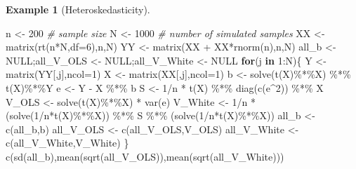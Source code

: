 \documentclass[
  12pt,
]{book}
\newenvironment{Shaded}{\begin{snugshade}}{\end{snugshade}}
\newcommand{\AttributeTok}[1]{\textcolor[rgb]{0.77,0.63,0.00}{#1}}
\newcommand{\CommentTok}[1]{\textcolor[rgb]{0.56,0.35,0.01}{\textit{#1}}}
\newcommand{\ConstantTok}[1]{\textcolor[rgb]{0.00,0.00,0.00}{#1}}
\newcommand{\ControlFlowTok}[1]{\textcolor[rgb]{0.13,0.29,0.53}{\textbf{#1}}}
\newcommand{\DecValTok}[1]{\textcolor[rgb]{0.00,0.00,0.81}{#1}}
\newcommand{\FunctionTok}[1]{\textcolor[rgb]{0.00,0.00,0.00}{#1}}
\newcommand{\NormalTok}[1]{#1}
\newcommand{\OtherTok}[1]{\textcolor[rgb]{0.56,0.35,0.01}{#1}}
\newcommand{\SpecialCharTok}[1]{\textcolor[rgb]{0.00,0.00,0.00}{#1}}
\theoremstyle{definition}
\theoremstyle{definition}
\newtheorem{example}{Example}[chapter]
\theoremstyle{definition}
\theoremstyle{definition}
\theoremstyle{remark}
\begin{document}
\begin{example}[Heteroskedasticity]
\begin{Shaded}
\begin{Highlighting}[]
\NormalTok{n }\OtherTok{\textless{}{-}} \DecValTok{200} \CommentTok{\# sample size}
\NormalTok{N }\OtherTok{\textless{}{-}} \DecValTok{1000} \CommentTok{\# number of simulated samples}
\NormalTok{XX }\OtherTok{\textless{}{-}} \FunctionTok{matrix}\NormalTok{(}\FunctionTok{rt}\NormalTok{(n}\SpecialCharTok{*}\NormalTok{N,}\AttributeTok{df=}\DecValTok{6}\NormalTok{),n,N)}
\NormalTok{YY }\OtherTok{\textless{}{-}} \FunctionTok{matrix}\NormalTok{(XX }\SpecialCharTok{+}\NormalTok{ XX}\SpecialCharTok{*}\FunctionTok{rnorm}\NormalTok{(n),n,N)}
\NormalTok{all\_b       }\OtherTok{\textless{}{-}} \ConstantTok{NULL}\NormalTok{;all\_V\_OLS   }\OtherTok{\textless{}{-}} \ConstantTok{NULL}\NormalTok{;all\_V\_White }\OtherTok{\textless{}{-}} \ConstantTok{NULL}
\ControlFlowTok{for}\NormalTok{(j }\ControlFlowTok{in} \DecValTok{1}\SpecialCharTok{:}\NormalTok{N)\{}
\NormalTok{  Y }\OtherTok{\textless{}{-}} \FunctionTok{matrix}\NormalTok{(YY[,j],}\AttributeTok{ncol=}\DecValTok{1}\NormalTok{)}
\NormalTok{  X }\OtherTok{\textless{}{-}} \FunctionTok{matrix}\NormalTok{(XX[,j],}\AttributeTok{ncol=}\DecValTok{1}\NormalTok{)}
\NormalTok{  b }\OtherTok{\textless{}{-}} \FunctionTok{solve}\NormalTok{(}\FunctionTok{t}\NormalTok{(X)}\SpecialCharTok{\%*\%}\NormalTok{X) }\SpecialCharTok{\%*\%} \FunctionTok{t}\NormalTok{(X)}\SpecialCharTok{\%*\%}\NormalTok{Y}
\NormalTok{  e }\OtherTok{\textless{}{-}}\NormalTok{ Y }\SpecialCharTok{{-}}\NormalTok{ X }\SpecialCharTok{\%*\%}\NormalTok{ b}
\NormalTok{  S }\OtherTok{\textless{}{-}} \DecValTok{1}\SpecialCharTok{/}\NormalTok{n }\SpecialCharTok{*} \FunctionTok{t}\NormalTok{(X) }\SpecialCharTok{\%*\%} \FunctionTok{diag}\NormalTok{(}\FunctionTok{c}\NormalTok{(e}\SpecialCharTok{\^{}}\DecValTok{2}\NormalTok{)) }\SpecialCharTok{\%*\%}\NormalTok{ X}
\NormalTok{  V\_OLS   }\OtherTok{\textless{}{-}} \FunctionTok{solve}\NormalTok{(}\FunctionTok{t}\NormalTok{(X)}\SpecialCharTok{\%*\%}\NormalTok{X) }\SpecialCharTok{*} \FunctionTok{var}\NormalTok{(e)}
\NormalTok{  V\_White }\OtherTok{\textless{}{-}} \DecValTok{1}\SpecialCharTok{/}\NormalTok{n }\SpecialCharTok{*}\NormalTok{ (}\FunctionTok{solve}\NormalTok{(}\DecValTok{1}\SpecialCharTok{/}\NormalTok{n}\SpecialCharTok{*}\FunctionTok{t}\NormalTok{(X)}\SpecialCharTok{\%*\%}\NormalTok{X)) }\SpecialCharTok{\%*\%}\NormalTok{ S }\SpecialCharTok{\%*\%}\NormalTok{ (}\FunctionTok{solve}\NormalTok{(}\DecValTok{1}\SpecialCharTok{/}\NormalTok{n}\SpecialCharTok{*}\FunctionTok{t}\NormalTok{(X)}\SpecialCharTok{\%*\%}\NormalTok{X))}
\NormalTok{  all\_b       }\OtherTok{\textless{}{-}} \FunctionTok{c}\NormalTok{(all\_b,b)}
\NormalTok{  all\_V\_OLS   }\OtherTok{\textless{}{-}} \FunctionTok{c}\NormalTok{(all\_V\_OLS,V\_OLS)}
\NormalTok{  all\_V\_White }\OtherTok{\textless{}{-}} \FunctionTok{c}\NormalTok{(all\_V\_White,V\_White)}
\NormalTok{\}}
\FunctionTok{c}\NormalTok{(}\FunctionTok{sd}\NormalTok{(all\_b),}\FunctionTok{mean}\NormalTok{(}\FunctionTok{sqrt}\NormalTok{(all\_V\_OLS)),}\FunctionTok{mean}\NormalTok{(}\FunctionTok{sqrt}\NormalTok{(all\_V\_White)))}
\end{Highlighting}
\end{Shaded}


\end{example}
\end{document}
